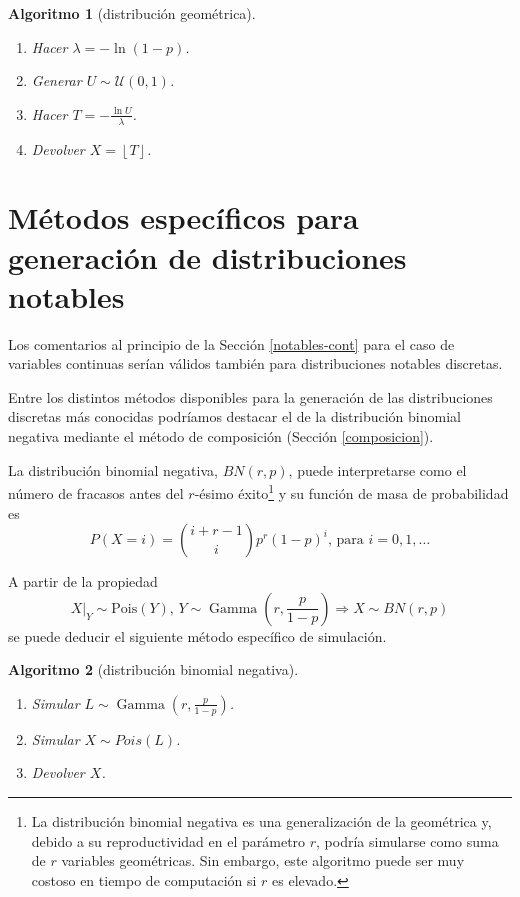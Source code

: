 \documentclass[
]{book}
\theoremstyle{break}
\newtheorem{conjecture}{Algoritmo}[chapter]
\theoremstyle{nonumberplain}
\begin{document}
\begin{conjecture}[distribución geométrica]
\protect\hypertarget{cnj:geometrica}{}\label{cnj:geometrica}

\begin{enumerate}
\def\labelenumi{\arabic{enumi}.}
\setcounter{enumi}{-1}
\item
  Hacer \(\lambda=-\ln\left( 1-p\right)\).
\item
  Generar \(U\sim \mathcal{U}\left( 0,1\right)\).
\item
  Hacer \(T=-\frac{\ln U}{\lambda}\).
\item
  Devolver \(X=\left\lfloor T\right\rfloor\).
\end{enumerate}

\end{conjecture}

\hypertarget{notables-disc}{%
\section{Métodos específicos para generación de distribuciones notables}\label{notables-disc}}

Los comentarios al principio de la Sección \ref{notables-cont} para el caso de variables continuas serían válidos también para distribuciones notables discretas.

Entre los distintos métodos disponibles para la generación de las distribuciones discretas más conocidas podríamos destacar el de la distribución binomial negativa mediante el método de composición (Sección \ref{composicion}).

La distribución binomial negativa, \(BN(r, p)\), puede interpretarse como el número de fracasos antes del \(r\)-ésimo éxito\footnote{La distribución binomial negativa es una generalización de la geométrica y, debido a su reproductividad en el parámetro \(r\), podría simularse como suma de \(r\) variables geométricas. Sin embargo, este algoritmo puede ser muy costoso en tiempo de computación si \(r\) es elevado.} y su función de masa de probabilidad es
\[P(X = i) = \binom{i+r-1}i p^r (1-p)^i \text{, para }i=0,1,\ldots\]

A partir de la propiedad
\[X|_{Y} \sim \text{Pois}\left(  Y\right)  \text{, }Y \sim \operatorname{Gamma} \left( r, \frac{p}{1-p}\right)  \Rightarrow X \sim BN(r, p)\]
se puede deducir el siguiente método específico de simulación.

\begin{conjecture}[distribución binomial negativa]
\protect\hypertarget{cnj:bin-neg}{}\label{cnj:bin-neg}

\begin{enumerate}
\def\labelenumi{\arabic{enumi}.}
\item
  Simular \(L \sim \operatorname{Gamma}\left( r, \frac{p}{1-p} \right)\).
\item
  Simular \(X \sim Pois \left( L\right)\).
\item
  Devolver \(X\).
\end{enumerate}

\end{conjecture}
\end{document}
